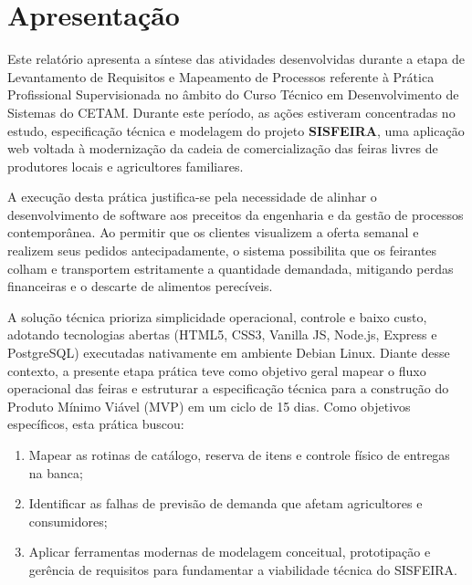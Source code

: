 \documentclass[12pt,a4paper]{article}
\begin{document}
\section{Apresentação}

Este relatório apresenta a síntese das atividades desenvolvidas durante a etapa de Levantamento de Requisitos e Mapeamento de Processos referente à Prática Profissional Supervisionada no âmbito do Curso Técnico em Desenvolvimento de Sistemas do CETAM. Durante este período, as ações estiveram concentradas no estudo, especificação técnica e modelagem do projeto \textbf{SISFEIRA}, uma aplicação web voltada à modernização da cadeia de comercialização das feiras livres de produtores locais e agricultores familiares.

A execução desta prática justifica-se pela necessidade de alinhar o desenvolvimento de software aos preceitos da engenharia e da gestão de processos contemporânea. Ao permitir que os clientes visualizem a oferta semanal e realizem seus pedidos antecipadamente, o sistema possibilita que os feirantes colham e transportem estritamente a quantidade demandada, mitigando perdas financeiras e o descarte de alimentos perecíveis.

A solução técnica prioriza simplicidade operacional, controle e baixo custo, adotando tecnologias abertas (HTML5, CSS3, Vanilla JS, Node.js, Express e PostgreSQL) executadas nativamente em ambiente Debian Linux. Diante desse contexto, a presente etapa prática teve como objetivo geral mapear o fluxo operacional das feiras e estruturar a especificação técnica para a construção do Produto Mínimo Viável (MVP) em um ciclo de 15 dias. Como objetivos específicos, esta prática buscou:

\begin{enumerate}[label=\alph*\*)]

    \item Mapear as rotinas de catálogo, reserva de itens e controle físico de entregas na banca;

    \item Identificar as falhas de previsão de demanda que afetam agricultores e consumidores;

    \item Aplicar ferramentas modernas de modelagem conceitual, prototipação e gerência de requisitos para fundamentar a viabilidade técnica do SISFEIRA.

\end{enumerate}

\newpage
\end{document}
